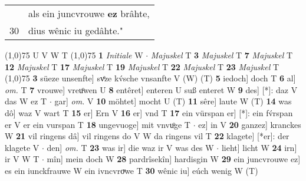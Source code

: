 \documentclass[8pt,a4paper,notitlepage]{article}
\begin{document}
\begin{table}[ht]
\begin{minipage}[t]{0.5\linewidth}
\begin{tabular}{rl}
 & als ein juncvrouwe \textbf{ez} brâhte,\\ 
30 & dius wênic iu gedâhte."\\ 
\end{tabular}
\scriptsize
\line(1,0){75} \newline
U V W T \newline
\line(1,0){75} \newline
\textbf{1} \textit{Initiale} W   $\cdot$ \textit{Majuskel} T  \textbf{3} \textit{Majuskel} T  \textbf{7} \textit{Majuskel} T  \textbf{12} \textit{Majuskel} T  \textbf{17} \textit{Majuskel} T  \textbf{19} \textit{Majuskel} T  \textbf{22} \textit{Majuskel} T  \textbf{23} \textit{Majuskel} T  \newline
\line(1,0){75} \newline
\textbf{3} süeze unsenfte] svͤze kv́sche vnsanfte V (W) (T) \textbf{5} iedoch] doch T \textbf{6} al] \textit{om.} T \textbf{7} vrouwe] vreuͦwen U \textbf{8} entêret] enteren U suß enteret W \textbf{9} des] [*]: daz V das W ez T  $\cdot$ gar] \textit{om.} V \textbf{10} möhtet] mocht U (T) \textbf{11} sêre] laute W (T) \textbf{14} was dô] waz V wart T \textbf{15} er] Ern V \textbf{16} er] vnd T \textbf{17} ein vürspan er] [*]: ein fv́rspan er V er ein vurspan T \textbf{18} ungevuoge] mit vnvuͦge T  $\cdot$ ez] in V \textbf{20} ganzez] kranckes W \textbf{21} vil ringens dâ] vil ringens do V W da ringens vil T \textbf{22} klagete] [*er]: der klagete V  $\cdot$ den] \textit{om.} T \textbf{23} was ir] die waz ir V was des W  $\cdot$ lieht] licht W \textbf{24} irn] ir V W T  $\cdot$ mîn] mein doch W \textbf{28} pardrîsekîn] hardisgin W \textbf{29} ein juncvrouwe ez] es ein iunckfrauwe W ein ivncvroͮwe T \textbf{30} wênic iu] eúch wenig W (T) \newline
\end{minipage}
\end{table}
\end{document}
